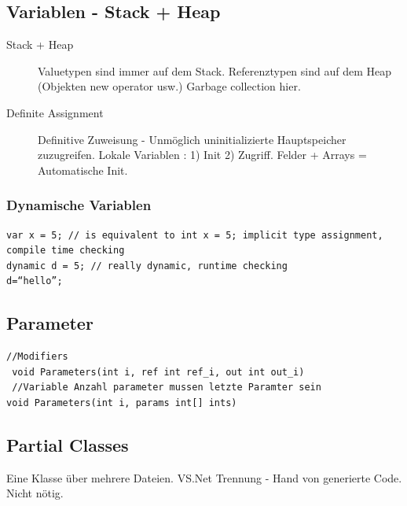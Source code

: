 \documentclass[a4paper,10pt]{scrartcl}
\begin{document}
\subsection{Variablen - Stack + Heap}

\begin{description}
 \item [Stack + Heap]
 \subitem Valuetypen sind immer auf dem Stack.
 \subitem Referenztypen sind auf dem Heap (Objekten new operator usw.) Garbage collection hier.
 \item [Definite Assignment] Definitive Zuweisung - Unmöglich uninitializierte Hauptspeicher zuzugreifen.
 \subitem Lokale Variablen : 1) Init 2) Zugriff.
 \subitem Felder + Arrays = Automatische Init.
\end{description}

\subsubsection{Dynamische Variablen}
\begin{lstlisting}[caption=Dynamische Variablen]
 var x = 5; // is equivalent to int x = 5; implicit type assignment, compile time checking
dynamic d = 5; // really dynamic, runtime checking
d‏=‏“hello”;

\end{lstlisting}

\subsection{Parameter}
\begin{lstlisting}[caption=Parameter Beispiel]
 //Modifiers
 void Parameters(int i, ref int ref_i, out int out_i)
 //Variable Anzahl parameter mussen letzte Paramter sein
void Parameters(int i, params int[] ints)
\end{lstlisting}

\subsection{Partial Classes}
Eine Klasse über mehrere Dateien.
VS.Net Trennung - Hand von generierte Code. Nicht nötig.
\end{document}
